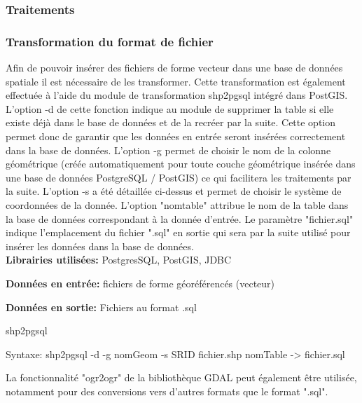 \subsubsection{Traitements}

\subsubsection{Transformation du format de fichier}

Afin de pouvoir insérer des fichiers de forme vecteur dans une base de données spatiale il est nécessaire de les transformer. Cette transformation est également effectuée à l'aide du module de transformation shp2pgsql intégré dans PostGIS. L'option -d de cette fonction indique au module de supprimer la table si elle existe déjà dans le base de données et de la recréer par la suite. Cette option permet donc de garantir que les données en entrée seront insérées correctement dans la base de données. L'option -g permet de choisir le nom de la colonne géométrique (créée automatiquement pour toute couche géométrique insérée dans une base de données PostgreSQL / PostGIS) ce qui facilitera les traitements par la suite. L'option -s a été détaillée ci-dessus et permet de choisir le système de coordonnées de la donnée. L'option "nomtable" attribue le nom de la table dans la base de données correspondant à la donnée d'entrée. Le paramètre "fichier.sql" indique l'emplacement du fichier ".sql" en sortie qui sera par la suite utilisé pour insérer les données dans la base de données.\\

\textbf{Librairies utilisées:} PostgresSQL, PostGIS, JDBC 

\textbf{Données en entrée:} fichiers de forme géoréférencés (vecteur)

\textbf{Données en sortie:} Fichiers au format .sql \\

\begin{algorithm}[H]
\caption{\label{traitement2} shp2pgsql}
Syntaxe:
shp2pgsql -d -g nomGeom -s SRID fichier.shp nomTable -> fichier.sql \\
\end{algorithm}

La fonctionnalité "ogr2ogr" de la bibliothèque GDAL  peut également être utilisée, notamment pour des conversions vers d'autres formats  que le format ".sql".

